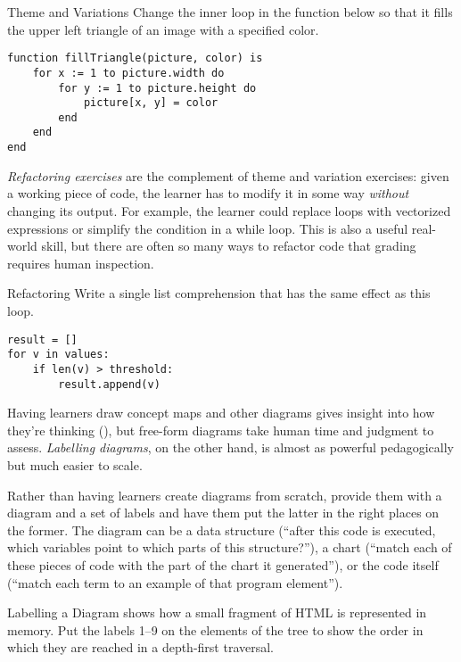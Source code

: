 \begin{aside}{Theme and Variations}
  Change the inner loop in the function below
  so that it fills the upper left triangle of an image with a specified color.

\begin{verbatim}
function fillTriangle(picture, color) is
    for x := 1 to picture.width do
        for y := 1 to picture.height do
            picture[x, y] = color
        end
    end
end
\end{verbatim}
\end{aside}

\emph{Refactoring exercises} are the complement of theme and variation exercises:
given a working piece of code,
the learner has to modify it in some way \emph{without} changing its output.
For example,
the learner could replace loops with vectorized expressions
or simplify the condition in a while loop.
This is also a useful real-world skill,
but there are often so many ways to refactor code
that grading requires human inspection.

\begin{aside}{Refactoring}
  Write a single list comprehension
  that has the same effect as this loop.

\begin{verbatim}
result = []
for v in values:
    if len(v) > threshold:
        result.append(v)
\end{verbatim}
\end{aside}


Having learners draw concept maps and other diagrams
gives insight into how they're thinking (),
but free-form diagrams take human time and judgment to assess.
\emph{Labelling diagrams},
on the other hand,
is almost as powerful pedagogically
but much easier to scale.

Rather than having learners create diagrams from scratch,
provide them with a diagram and a set of labels
and have them put the latter in the right places on the former.
The diagram can be a data structure
(``after this code is executed, which variables point to which parts of this structure?''),
a chart (``match each of these pieces of code with the part of the chart it generated''),
or the code itself (``match each term to an example of that program element'').

\begin{aside}{Labelling a Diagram}
   shows
  how a small fragment of HTML is represented in memory.
  Put the labels 1--9 on the elements of the tree
  to show the order in which they are reached in a depth-first traversal.
\end{aside}

